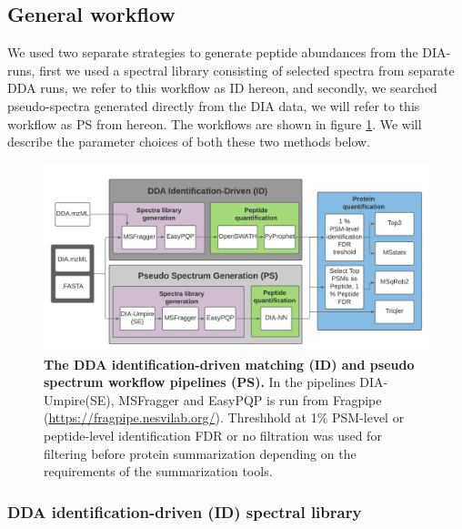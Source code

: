 \documentclass[10pt,letterpaper]{article}
\begin{document}
\subsection*{General workflow}

We used two separate strategies to generate peptide abundances from the DIA-runs, first we used a spectral library consisting of selected spectra from separate DDA runs, we refer to this workflow as ID hereon, and secondly, we searched pseudo-spectra generated directly from the DIA data, we will refer to this workflow as PS from hereon. The workflows are shown in figure \ref{fig:flowchart}. We will describe the parameter choices of both these two methods below.

\begin{figure}[htp]
    \centering
    \includegraphics[width=1.0\linewidth]{../../result/report_plots/DIA_benchmark_truncated.png} 
    \caption{{\bf The DDA identification-driven matching (ID) and pseudo spectrum workflow pipelines (PS).} In the pipelines DIA-Umpire(SE), MSFragger and EasyPQP is run from Fragpipe (\protect\url{https://fragpipe.nesvilab.org/}). Threshhold at 1\% PSM-level or peptide-level identification FDR or no filtration was used for filtering before protein summarization depending on the requirements of the summarization tools. \label{fig:flowchart}}      
\end{figure}



\subsubsection*{DDA identification-driven (ID) spectral library}
\end{document}
